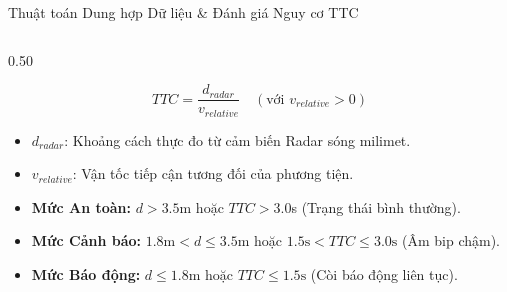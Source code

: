 \documentclass[aspectratio=169, 11pt]{beamer}
\begin{document}
\begin{frame}{Thuật toán Dung hợp Dữ liệu \& Đánh giá Nguy cơ TTC}
  \vspace{-0.15cm}
  \begin{columns}[T, onlytextwidth]
    \begin{column}{0.50\textwidth}
      \par
      \vspace{0.08cm}
      \begin{equation*}
        TTC = \frac{d_{radar}}{v_{relative}} \quad (\text{với } v_{relative} > 0)
      \end{equation*}
      {\fontsize{7.0pt}{8.8pt}\selectfont
      \begin{itemize}
        \item $d_{radar}$: Khoảng cách thực đo từ cảm biến Radar sóng milimet.
        \item $v_{relative}$: Vận tốc tiếp cận tương đối của phương tiện.
      \end{itemize}}

      \vspace{0.08cm}
      \par
      \vspace{0.05cm}
      {\fontsize{7.0pt}{8.8pt}\selectfont
      \begin{itemize}
        \item \textbf{Mức An toàn:} $d > 3.5$m hoặc $TTC > 3.0$s (Trạng thái bình thường).
        \item \textbf{Mức Cảnh báo:} $1.8\text{m} < d \le 3.5\text{m}$ hoặc $1.5\text{s} < TTC \le 3.0\text{s}$ (Âm bip chậm).
        \item \textbf{Mức Báo động:} $d \le 1.8\text{m}$ hoặc $TTC \le 1.5\text{s}$ (Còi báo động liên tục).
      \end{itemize}}
    \end{column}


\end{columns}
\end{frame}
\end{document}
